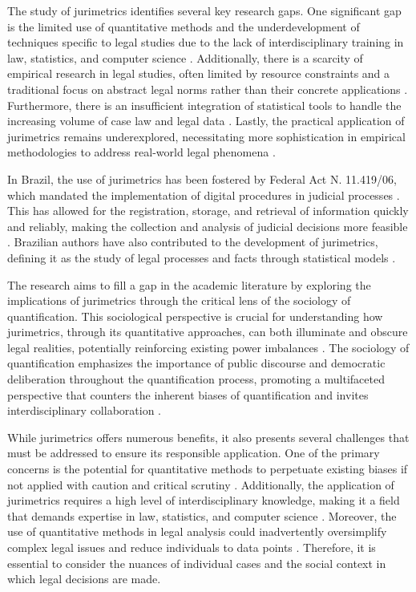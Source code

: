 The study of jurimetrics identifies several key research gaps. One significant gap is the limited use of quantitative methods and the underdevelopment of techniques specific to legal studies due to the lack of interdisciplinary training in law, statistics, and computer science \cite{nunes2018,nunes2018}. Additionally, there is a scarcity of empirical research in legal studies, often limited by resource constraints and a traditional focus on abstract legal norms rather than their concrete applications \cite{nunes2018}. Furthermore, there is an insufficient integration of statistical tools to handle the increasing volume of case law and legal data \cite{de2010}. Lastly, the practical application of jurimetrics remains underexplored, necessitating more sophistication in empirical methodologies to address real-world legal phenomena \cite{massuanganhe2016}.

In Brazil, the use of jurimetrics has been fostered by Federal Act N. 11.419/06, which mandated the implementation of digital procedures in judicial processes \cite{103390fi9040068}. This has allowed for the registration, storage, and retrieval of information quickly and reliably, making the collection and analysis of judicial decisions more feasible \cite{103390fi9040068}. Brazilian authors have also contributed to the development of jurimetrics, defining it as the study of legal processes and facts through statistical models \cite{silva2023role}.

The research aims to fill a gap in the academic literature by exploring the implications of jurimetrics through the critical lens of the sociology of quantification. This sociological perspective is crucial for understanding how jurimetrics, through its quantitative approaches, can both illuminate and obscure legal realities, potentially reinforcing existing power imbalances \cite{10.1590/dados.2022.65.3.267,10.1080/07329113.2015.1046739}. The sociology of quantification emphasizes the importance of public discourse and democratic deliberation throughout the quantification process, promoting a multifaceted perspective that counters the inherent biases of quantification and invites interdisciplinary collaboration \cite{10.1590/dados.2022.65.3.267,10.1080/07329113.2015.1046739}.

While jurimetrics offers numerous benefits, it also presents several challenges that must be addressed to ensure its responsible application. One of the primary concerns is the potential for quantitative methods to perpetuate existing biases if not applied with caution and critical scrutiny \cite{ccdacdfbcdaf,efbfffafaacadd}. Additionally, the application of jurimetrics requires a high level of interdisciplinary knowledge, making it a field that demands expertise in law, statistics, and computer science \cite{ccdacdfbcdaf,efbfffafaacadd}. Moreover, the use of quantitative methods in legal analysis could inadvertently oversimplify complex legal issues and reduce individuals to data points \cite{ccdacdfbcdaf,efbfffafaacadd}. Therefore, it is essential to consider the nuances of individual cases and the social context in which legal decisions are made.

